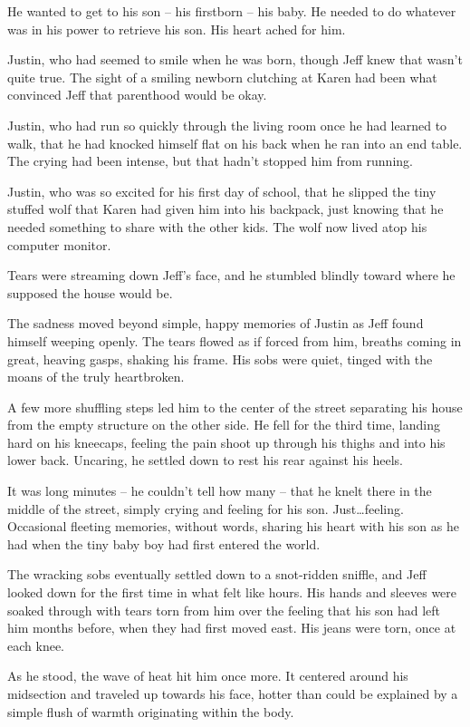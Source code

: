 He wanted to get to his son -- his firstborn -- his baby.  He needed to do whatever was in his power to retrieve his son.  His heart ached for him.

Justin, who had seemed to smile when he was born, though Jeff knew that wasn't quite true.  The sight of a smiling newborn clutching at Karen had been what convinced Jeff that parenthood would be okay.

Justin, who had run so quickly through the living room once he had learned to walk, that he had knocked himself flat on his back when he ran into an end table.  The crying had been intense, but that hadn't stopped him from running.

Justin, who was so excited for his first day of school, that he slipped the tiny stuffed wolf that Karen had given him into his backpack, just knowing that he needed something to share with the other kids.  The wolf now lived atop his computer monitor.

Tears were streaming down Jeff's face, and he stumbled blindly toward where he supposed the house would be.

The sadness moved beyond simple, happy memories of Justin as Jeff found himself weeping openly.  The tears flowed as if forced from him, breaths coming in great, heaving gasps, shaking his frame.  His sobs were quiet, tinged with the moans of the truly heartbroken.

A few more shuffling steps led him to the center of the street separating his house from the empty structure on the other side.  He fell for the third time, landing hard on his kneecaps, feeling the pain shoot up through his thighs and into his lower back.  Uncaring, he settled down to rest his rear against his heels.

It was long minutes -- he couldn't tell how many -- that he knelt there in the middle of the street, simply crying and feeling for his son.  Just\ldots{}feeling.  Occasional fleeting memories, without words, sharing his heart with his son as he had when the tiny baby boy had first entered the world.

The wracking sobs eventually settled down to a snot-ridden sniffle, and Jeff looked down for the first time in what felt like hours.  His hands and sleeves were soaked through with tears torn from him over the feeling that his son had left him months before, when they had first moved east.  His jeans were torn, once at each knee.

As he stood, the wave of heat hit him once more.  It centered around his midsection and traveled up towards his face, hotter than could be explained by a simple flush of warmth originating within the body.

